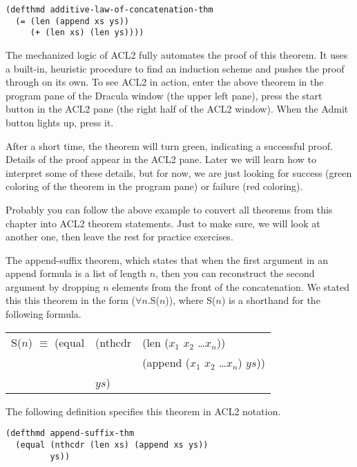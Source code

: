 \begin{lstlisting}
(defthmd additive-law-of-concatenation-thm
  (= (len (append xs ys))
     (+ (len xs) (len ys))))
\end{lstlisting}

The mechanized logic of ACL2 fully automates the proof of this theorem. It uses a built-in, heuristic procedure to find an induction scheme and pushes the proof through on its own. To see ACL2 in action, enter the above theorem in the program pane of the Dracula window (the upper left pane), press the start button in the ACL2 pane (the right half of the ACL2 window). When the Admit button lights up, press it.

After a short time, the theorem will turn green, indicating a successful proof. Details of the proof appear in the ACL2 pane. Later we will learn how to interpret some of these details, but for now, we are just looking for success (green coloring of the theorem in the program pane) or failure (red coloring).

Probably you can follow the above example to convert all theorems from this chapter into ACL2 theorem statements. Just to make sure, we will look at another one, then leave the rest for practice exercises.

The append-suffix theorem, which states that when the first argument in an append formula is a list of length $n$, then you can reconstruct the second argument by dropping $n$ elements from the front of the concatenation. We stated this this theorem in the form ($\forall$$n$.S($n$)), where S($n$) is a shorthand for the following formula.

\begin{center}
\begin{tabular}{lll}
S($n$) $\equiv$ (equal & (nthcdr & (len ($x_1$ $x_2$ \dots $x_n$))          \\
                       &         & (append ($x_1$ $x_2$ \dots $x_n$) $ys$)) \\
                       & $ys$)   &                                          \\
\end{tabular}
\end{center}

The following definition specifies this theorem in ACL2 notation.

\begin{lstlisting}
(defthmd append-suffix-thm
  (equal (nthcdr (len xs) (append xs ys))
         ys))
\end{lstlisting}

